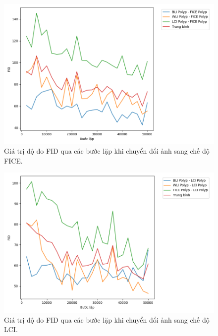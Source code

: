 \documentclass[12pt]{extreport}
\begin{document}
\begin{figure}[H]
    \centering
    \includegraphics[width=\linewidth]{fid/FID_FICE.png}
    \caption{Giá trị độ đo FID qua các bước lặp khi chuyển đổi ảnh sang chế độ FICE.}
\end{figure}

\begin{figure}[H]
    \centering
    \includegraphics[width=\linewidth]{fid/FID_LCI.png}
    \caption{Giá trị độ đo FID qua các bước lặp khi chuyển đổi ảnh sang chế độ LCI.}
\end{figure}
\end{document}
